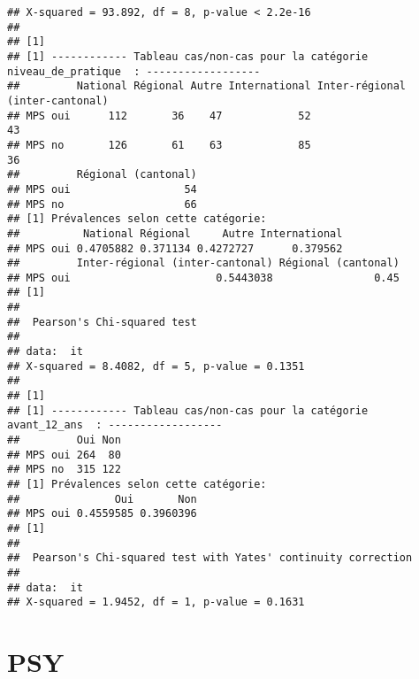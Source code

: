 \documentclass[
]{article}
\begin{document}
\begin{verbatim}
## X-squared = 93.892, df = 8, p-value < 2.2e-16
## 
## [1] 
## [1] ------------ Tableau cas/non-cas pour la catégorie  niveau_de_pratique  : ------------------
##         National Régional Autre International Inter-régional (inter-cantonal)
## MPS oui      112       36    47            52                              43
## MPS no       126       61    63            85                              36
##         Régional (cantonal)
## MPS oui                  54
## MPS no                   66
## [1] Prévalences selon cette catégorie:
##          National Régional     Autre International
## MPS oui 0.4705882 0.371134 0.4272727      0.379562
##         Inter-régional (inter-cantonal) Régional (cantonal)
## MPS oui                       0.5443038                0.45
## [1] 
## 
##  Pearson's Chi-squared test
## 
## data:  it
## X-squared = 8.4082, df = 5, p-value = 0.1351
## 
## [1] 
## [1] ------------ Tableau cas/non-cas pour la catégorie  avant_12_ans  : ------------------
##         Oui Non
## MPS oui 264  80
## MPS no  315 122
## [1] Prévalences selon cette catégorie:
##               Oui       Non
## MPS oui 0.4559585 0.3960396
## [1] 
## 
##  Pearson's Chi-squared test with Yates' continuity correction
## 
## data:  it
## X-squared = 1.9452, df = 1, p-value = 0.1631
\end{verbatim}

\hypertarget{psy}{%
\section{PSY}\label{psy}}
\end{document}
